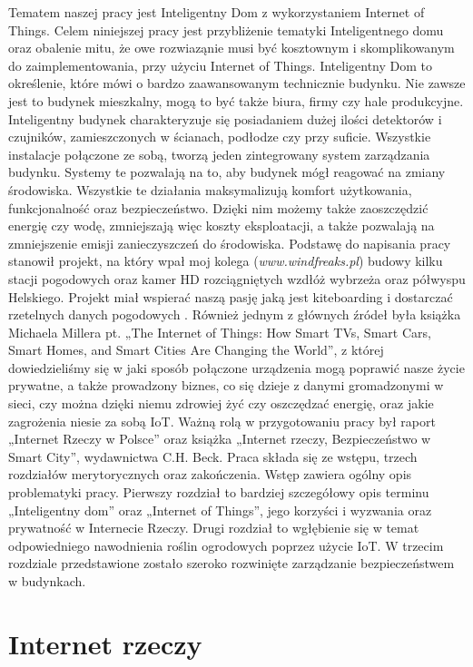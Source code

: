 \documentclass[brudnopis]{xmgr}
\begin{document}
Tematem naszej pracy jest Inteligentny Dom z wykorzystaniem Internet of Things. Celem niniejszej pracy jest przybliżenie tematyki Inteligentnego domu oraz obalenie mitu, że owe rozwiaząnie musi być kosztownym i skomplikowanym do zaimplementowania, przy użyciu Internet of Things. Inteligentny Dom to określenie, które mówi o bardzo zaawansowanym technicznie budynku. Nie zawsze jest to budynek mieszkalny, mogą to być także  biura, firmy czy hale produkcyjne. 
Inteligentny budynek charakteryzuje się posiadaniem dużej ilości detektorów i czujników, zamieszczonych w ścianach, podłodze czy przy suficie. Wszystkie instalacje połączone ze sobą, tworzą jeden zintegrowany system zarządzania budynku. Systemy te pozwalają na to, aby budynek mógł reagować na zmiany środowiska. Wszystkie te działania maksymalizują komfort użytkowania, funkcjonalność oraz bezpieczeństwo. Dzięki nim możemy także zaoszczędzić energię czy wodę, zmniejszają więc koszty eksploatacji, a także pozwalają na zmniejszenie emisji zanieczyszczeń do środowiska. 
Podstawę do napisania pracy stanowił projekt, na który wpał moj kolega (\emph{www.windfreaks.pl}) budowy kilku stacji pogodowych oraz kamer HD rozciągniętych wzdłóż wybrzeża oraz półwyspu Helskiego. Projekt miał wspierać naszą pasję jaką jest kiteboarding i dostarczać rzetelnych danych pogodowych . Również jednym z głównych źródeł była książka Michaela Millera pt. „The Internet of Things: How Smart TVs, Smart Cars, Smart Homes, and Smart Cities Are Changing the World”, z której dowiedzieliśmy się w jaki sposób połączone urządzenia mogą poprawić nasze życie prywatne, a także prowadzony biznes, co się dzieje z danymi gromadzonymi w sieci, czy można dzięki niemu zdrowiej żyć czy oszczędzać energię, oraz jakie zagrożenia niesie za sobą IoT. Ważną rolą w przygotowaniu pracy był raport „Internet Rzeczy w Polsce” oraz książka „Internet rzeczy, Bezpieczeństwo w Smart City”, wydawnictwa C.H. Beck. 
Praca składa się ze wstępu, trzech rozdziałów merytorycznych oraz zakończenia. Wstęp zawiera ogólny opis problematyki pracy. Pierwszy rozdział to bardziej szczegółowy opis terminu „Inteligentny dom” oraz „Internet of Things”, jego korzyści i wyzwania oraz prywatność w Internecie Rzeczy. Drugi rozdział to wgłębienie się w temat odpowiedniego nawodnienia roślin ogrodowych poprzez użycie IoT.  W trzecim rozdziale przedstawione zostało szeroko rozwinięte zarządzanie bezpieczeństwem w budynkach.

\chapter{Internet rzeczy}
\end{document}
